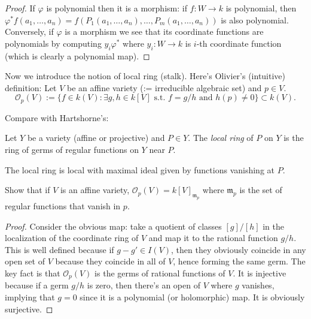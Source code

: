 \begin{proof}
If $\varphi$ is polynomial then it is a
morphism:
if $f:W \to k$ is polynomial,
then
$\varphi^*f(a_1,…,a_n)=f(P_1(a_1,…,a_n),…,
P_m(a_1,…,a_n))$
is also polynomial.
Conversely, if $\varphi$ is a morphism
we see that its coordinate functions are
polynomials
by computing $y_i\varphi^*$ where $y_i:W \to
k$
is $i$-th coordinate function (which is
clearly a polynomial map).
\end{proof}

\medskip\noindent
Now we introduce the notion of local ring
(stalk).
Here's Olivier's (intuitive) definition:
Let $V$ be an affine variety (:= irreducible
algebraic set)
and $p \in V$.
$$
\mathcal{O}_p(V)
:= \{f \in k(V):\exists g,h \in k[V]
\text{ s.t. }f=g/h \text{ and } h(p) \neq
0\}\subset k(V).
$$

Compare with Hartshorne's:

\begin{definition}
\label{definition-local-ring}
Let $Y$ be a variety (affine or projective)
and $P \in Y$.
The {\it local ring} of $P$ on $Y$ is
the ring of germs of regular functions on $Y$
near $P$.
\end{definition}

\begin{exercise}
\label{exercise-local-ring-is-local}
The local ring is local with maximal ideal
given by functions vanishing at $P$.
\end{exercise}


\begin{exercise}
\label{exercise-stalk-affine-varieties}
Show that if $V$ is an affine variety,
$\mathcal{O}_p(V) =
k[V]_{\mathfrak{m}_p}$
where $\mathfrak{m}_p$ is the set of regular
functions
that vanish in $p$.
\end{exercise}

\begin{proof}
Consider the obvious map: take a quotient of
classes
$[g]/[h]$ in the localization of the
coordinate ring of $V$
and map it to the rational function $g/h$.
This is well defined because if $g-g' \in
I(V)$,
then they obviously coincide in any open set
of $V$
because they coincide in all of $V$, hence
forming the same germ.
The key fact is that $\mathcal{O}_p(V)$ is
the germs of rational
functions of $V$.
It is injective because if a germ $g/h$ is
zero, then there's
an open of $V$ where $g$ vanishes, implying
that $g=0$
since it is a polynomial (or holomorphic)
map.
It is obviously surjective.
\end{proof}

